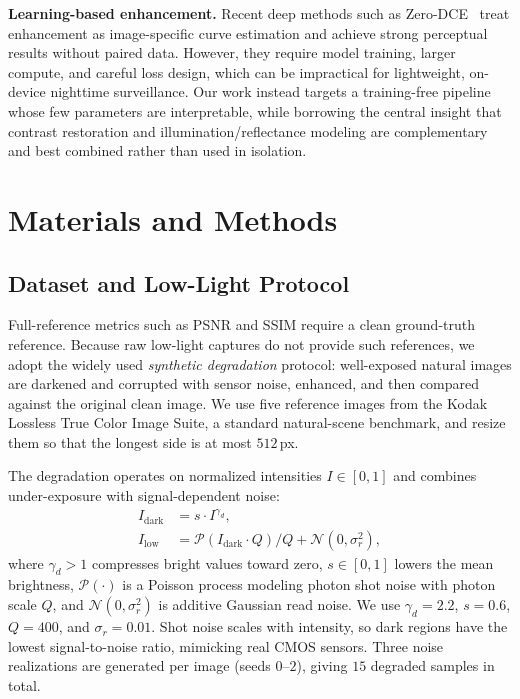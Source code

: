 \documentclass[conference,a4paper]{IEEEtran}
\begin{document}
\textbf{Learning-based enhancement.} Recent deep methods such as
Zero-DCE~\cite{guo2020zerodce} treat enhancement as image-specific curve
estimation and achieve strong perceptual results without paired data. However,
they require model training, larger compute, and careful loss design, which can
be impractical for lightweight, on-device nighttime surveillance. Our work
instead targets a training-free pipeline whose few parameters are
interpretable, while borrowing the central insight that contrast restoration and
illumination/reflectance modeling are complementary and best combined rather
than used in isolation.

\section{Materials and Methods}

\subsection{Dataset and Low-Light Protocol}
Full-reference metrics such as PSNR and SSIM require a clean ground-truth
reference. Because raw low-light captures do not provide such references, we
adopt the widely used \emph{synthetic degradation} protocol: well-exposed
natural images are darkened and corrupted with sensor noise, enhanced, and then
compared against the original clean image. We use five reference images from the
Kodak Lossless True Color Image Suite, a standard natural-scene benchmark, and
resize them so that the longest side is at most $512$\,px.

The degradation operates on normalized intensities $I\in[0,1]$ and combines
under-exposure with signal-dependent noise:
\begin{align}
I_{\text{dark}} &= s \cdot I^{\gamma_d}, \\
I_{\text{low}}  &= \mathcal{P}\!\left(I_{\text{dark}}\cdot Q\right)/Q
                   + \mathcal{N}(0,\sigma_r^2),
\end{align}
where $\gamma_d>1$ compresses bright values toward zero, $s\in[0,1]$ lowers the
mean brightness, $\mathcal{P}(\cdot)$ is a Poisson process modeling photon
shot noise with photon scale $Q$, and $\mathcal{N}(0,\sigma_r^2)$ is additive
Gaussian read noise. We use $\gamma_d=2.2$, $s=0.6$, $Q=400$, and
$\sigma_r=0.01$. Shot noise scales with intensity, so dark regions have the
lowest signal-to-noise ratio, mimicking real CMOS sensors. Three noise
realizations are generated per image (seeds $0$--$2$), giving $15$ degraded
samples in total.
\end{document}
